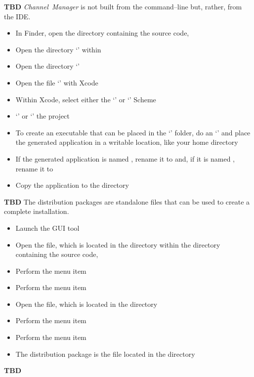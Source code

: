 \tertiaryEnd{}
\textbf{TBD}
\tertiaryEnd{}
\secondaryEnd{}
\textit{Channel~Manager} is not built from the command--line but, rather, from the IDE.
\begin{itemize}
\item In Finder, open the directory containing the \mplusm source code, 
\item Open the directory `' within
\item Open the directory `'
\item Open the file `' with Xcode
\item Within Xcode, select either the `' or
`' Scheme
\item `' or `' the
project
\item To create an executable that can be placed in the `' folder,
do an `'
and place the generated application in a writable location, like your home directory
\item If the generated application is named , rename it to
 and, if it is named , rename it
to 
\item Copy the  application to the 
directory
\end{itemize}
\tertiaryEnd{}
\textbf{TBD}
\tertiaryEnd{}
\secondaryEnd{}
The distribution packages are standalone files that can be used to create a complete
\mplusm{} installation.
\begin{itemize}
\item Launch the  GUI tool
\item Open the  file, which is located in the
 directory within the directory containing the \mplusm{} source
code, 
\item Perform the menu item 
\item Perform the menu item 
\item Open the  file, which is located in the  directory
\item Perform the menu item 
\item Perform the menu item 
\item The distribution package is the  file located in the
 directory
\end{itemize}
\tertiaryEnd{}
\textbf{TBD}
\tertiaryEnd{}
\secondaryEnd{}
\appendixEnd{}
